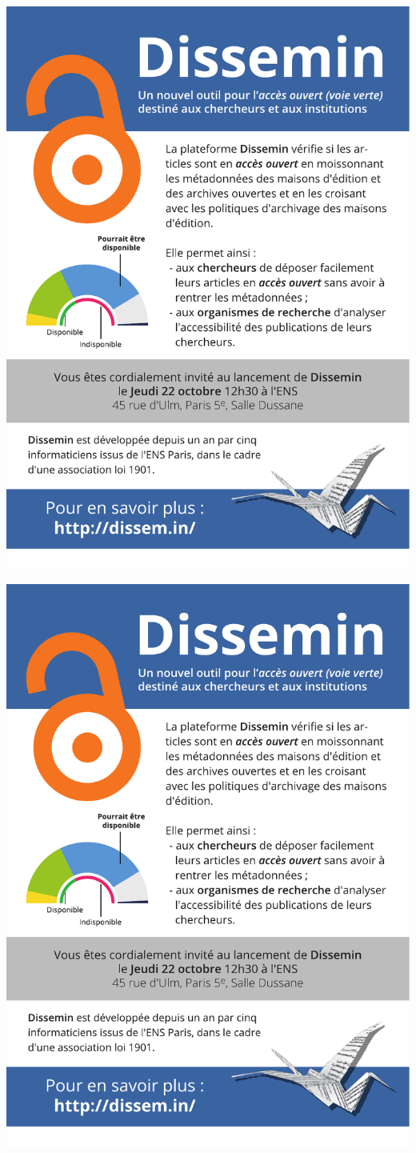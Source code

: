 \documentclass{article}
\begin{document}
\noindent
\begin{minipage}{.5\linewidth}
\includegraphics[width=\linewidth]{dissemina.pdf}
\end{minipage}
\begin{minipage}{.5\linewidth}
\includegraphics[width=\linewidth]{dissemina.pdf}
\end{minipage}
\end{document}
